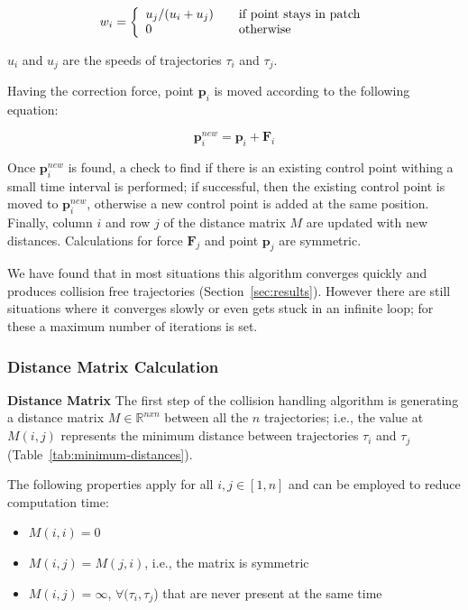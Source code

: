\begin{equation}
w_i = \left\{
	\begin{array}{l l}
		u_j / (u_i + u_j)	&	\quad \text{if point stays in patch}\\
		0					&	\quad \text{otherwise}
	\end{array}
	\right.
\end{equation}

$u_i$ and $u_j$ are the speeds of trajectories $\tau_i$ and $\tau_j$.

Having the correction force, point $\mathbf{p}_i$ is moved according to the following equation:

\begin{equation}
	\mathbf{p}_i^{new} = \mathbf{p}_i + \mathbf{F}_i
\end{equation}


Once $\mathbf{p}_i^{new}$ is found, a check to find if there is an existing control point withing a small time interval is performed; if successful, then the existing control point is moved to $\mathbf{p}_i^{new}$, otherwise a new control point is added at the same position.
Finally, column $i$ and row $j$ of the distance matrix $M$ are updated with new distances.
Calculations for force $\mathbf{F}_j$ and point $\mathbf{p}_j$ are symmetric.

We have found that in most situations this algorithm converges quickly and produces collision free trajectories (Section~\ref{sec:results}).
However there are still situations where it converges slowly or even gets stuck in an infinite loop; for these a maximum number of iterations is set.


\subsubsection{Distance Matrix Calculation}
\label{sec:method:remove-collisions:distance-matrix}
\textbf{Distance Matrix} The first step of the collision handling algorithm is generating a distance matrix $M \in \mathbb{R}^{nxn}$ between all the $n$ trajectories; i.e., the value at $M(i, j)$ represents the minimum distance between trajectories $\tau_i$ and $\tau_j$ (Table~{\ref{tab:minimum-distances}}).

The following properties apply for all $i, j \in [1, n]$ and can be employed to reduce computation time:
\begin{itemize}
  \item $M(i, i) = 0$
  \item $M(i, j) = M(j, i)$, i.e., the matrix is symmetric
  \item $M(i, j) = \infty$, \hspace{0.1cm}$\forall (\tau_i, \tau_j$) that are never present at the same time
\end{itemize}

